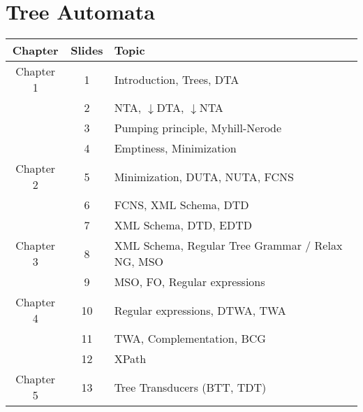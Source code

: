 \documentclass{article}
\begin{document}
\section*{Tree Automata}
\begin{tabular}{c|c|l}
	\textbf{Chapter} & \textbf{Slides} & \textbf{Topic} \\ \hline
	Chapter 1 & 1 & Introduction, Trees, DTA
	\\ \hline
	& 2 & NTA, $\downarrow$DTA, $\downarrow$NTA
	\\ \hline
	& 3 & Pumping principle, Myhill-Nerode
	\\ \hline
	& 4 & Emptiness, Minimization
	\\ \hline
	Chapter 2 & 5 & Minimization, DUTA, NUTA, FCNS
	\\ \hline
	& 6 & FCNS, XML Schema, DTD
	\\ \hline
	& 7 & XML Schema, DTD, EDTD
	\\ \hline
	Chapter 3 & 8 & XML Schema, Regular Tree Grammar / Relax NG, MSO
	\\ \hline
	& 9 & MSO, FO, Regular expressions
	\\ \hline
	Chapter 4 & 10 & Regular expressions, DTWA, TWA
	\\ \hline
	& 11 & TWA, Complementation, BCG
	\\ \hline
	& 12 & XPath
	\\ \hline
	Chapter 5 & 13 & Tree Transducers (BTT, TDT)
\end{tabular}
\end{document}
